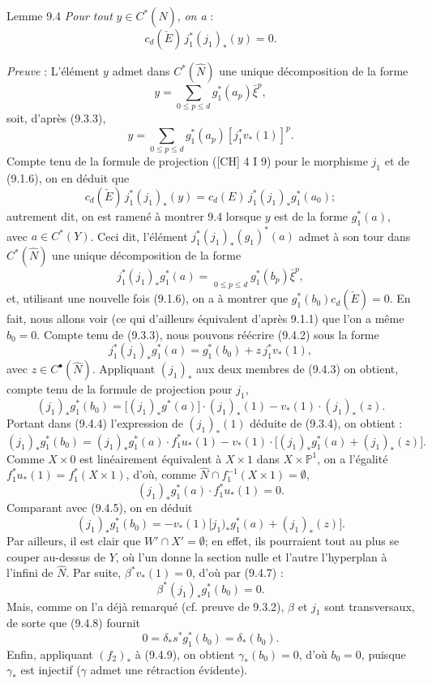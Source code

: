 \begin{statement}{Lemme 9.4}
\emph{Pour tout} $y\in C^*(\widehat N)$, \emph{on a} :
\[
c_d(\check E)\,j_1^*(j_1)_*(y)=0.
\]
\end{statement}

\emph{Preuve} : L'élément $y$ admet dans $C^*(\widehat N)$ une unique décomposition de la forme
\[
y=\sum_{0\le p\le d}g_1^*(a_p)\bar\xi^p,
\]
soit, d'après (9.3.3),
\[
y=\sum_{0\le p\le d}g_1^*(a_p)[j_1^*v_*(1)]^p.
\tag{9.4.1}
\]
Compte tenu de la formule de projection ([CH] 4 I 9) pour le morphisme $j_1$ et de (9.1.6), on en déduit que
\[
c_d(\check E)\,j_1^*(j_1)_*(y)=c_d(E)\,j_1^*(j_1)_*g_1^*(a_0);
\]
autrement dit, on est ramené à montrer 9.4 lorsque $y$ est de la forme $g_1^*(a)$, avec $a\in C^*(Y)$. Ceci dit, l'élément $j_1^*(j_1)_*(g_1)^*(a)$ admet à son tour dans $C^*(\widehat N)$ une unique décomposition de la forme
\[
j_1^*(j_1)_*g_1^*(a)=\mathop{\phantom{\sum}}\limits_{0\le p\le d}g_1^*(b_p)\bar\xi^p,
\tag{9.4.2}
\]
et,
utilisant une nouvelle fois (9.1.6), on a à montrer que $g_1^*(b_0)c_d(\check E)=0$. En fait, nous allons voir (ce qui d'ailleurs équivalent d'après 9.1.1) que l'on a même $b_0=0$. Compte tenu de (9.3.3), nous pouvons réécrire (9.4.2) sous la forme
\[
j_1^*(j_1)_*g_1^*(a)=g_1^*(b_0)+z\,j_1^*v_*(1),
\tag{9.4.3}
\]
avec $z\in C^{\bullet}(\widehat N)$. Appliquant $(j_1)_*$ aux deux membres de (9.4.3) on obtient, compte tenu de la formule de projection pour $j_1$,
\[
(j_1)_*g_1^*(b_0)=\bigl[(j_1)_*g^*(a)\bigr]\cdot(j_1)_*(1)-v_*(1)\cdot(j_1)_*(z).
\tag{9.4.4}
\]
Portant dans (9.4.4) l'expression de $(j_1)_*(1)$ déduite de (9.3.4), on obtient :
\[
(j_1)_*g_1^*(b_0)=
(j_1)_*g_1^*(a)\cdot f_1^*u_*(1)-v_*(1)\cdot\bigl[(j_1)_*g_1^*(a)+(j_1)_*(z)\bigr].
\tag{9.4.5}
\]
Comme $X\times0$ est linéairement équivalent à $X\times1$ dans $X\times\mathbb{P}^1$, on a l'égalité $f_1^*u_*(1)=f_1^*(X\times1)$, d'où, comme $\widehat N\cap f_1^{-1}(X\times1)=\emptyset$,
\[
(j_1)_*g_1^*(a)\cdot f_1^*u_*(1)=0.
\tag{9.4.6}
\]
Comparant avec (9.4.5), on en déduit
\[
(j_1)_*g_1^*(b_0)=-v_*(1)\bigl[j_1)_*g_1^*(a)+(j_1)_*(z)\bigr].
\tag{9.4.7}
\]
Par ailleurs, il est clair que $W'\cap X'=\emptyset$; en effet, ils pourraient tout au plus se couper au-dessus de $Y$, où l'un donne la section nulle et l'autre l'hyperplan à l'infini de $\widehat N$. Par suite, $\beta^*v_*(1)=0$, d'où par (9.4.7) :
\[
\beta^*(j_1)_*g_1^*(b_0)=0.
\tag{9.4.8}
\]
Mais, comme on l'a déjà remarqué (cf. preuve de 9.3.2), $\beta$ et $j_1$ sont transversaux, de sorte que (9.4.8) fournit
\[
0=\delta_*s^*g_1^*(b_0)=\delta_*(b_0).
\tag{9.4.9}
\]
Enfin,
appliquant $(f_2)_*$ à (9.4.9), on obtient $\gamma_*(b_0)=0$, d'où $b_0=0$, puisque $\gamma_*$ est injectif ($\gamma$ admet une rétraction évidente).


